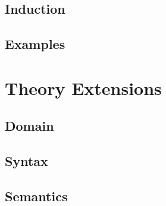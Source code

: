 \documentclass{book}
\begin{document}
\hypertarget{book__pandoc__debug__src__dmt1__lectures__l04_natarithmetic__induction.lean.md}{}
\hypertarget{book__pandoc__debug__src__dmt1__lectures__l04_natarithmetic__induction.lean.md__induction}{%
\section{Induction}\label{book__pandoc__debug__src__dmt1__lectures__l04_natarithmetic__induction.lean.md__induction}}

\hypertarget{book__pandoc__debug__src__dmt1__lectures__l04_natarithmetic__examples.lean.md}{}
\hypertarget{book__pandoc__debug__src__dmt1__lectures__l04_natarithmetic__examples.lean.md__examples}{%
\section{Examples}\label{book__pandoc__debug__src__dmt1__lectures__l04_natarithmetic__examples.lean.md__examples}}

\hypertarget{book__pandoc__debug__src__theoryextensions.md}{}
\hypertarget{book__pandoc__debug__src__theoryextensions.md__theory-extensions}{%
\chapter{Theory Extensions}\label{book__pandoc__debug__src__theoryextensions.md__theory-extensions}}

\hypertarget{book__pandoc__debug__src__dmt1__lectures__l05_theoryextensions__domain.lean.md}{}
\hypertarget{book__pandoc__debug__src__dmt1__lectures__l05_theoryextensions__domain.lean.md__domain}{%
\section{Domain}\label{book__pandoc__debug__src__dmt1__lectures__l05_theoryextensions__domain.lean.md__domain}}

\hypertarget{book__pandoc__debug__src__dmt1__lectures__l05_theoryextensions__syntax.lean.md}{}
\hypertarget{book__pandoc__debug__src__dmt1__lectures__l05_theoryextensions__syntax.lean.md__syntax}{%
\section{Syntax}\label{book__pandoc__debug__src__dmt1__lectures__l05_theoryextensions__syntax.lean.md__syntax}}

\hypertarget{book__pandoc__debug__src__dmt1__lectures__l05_theoryextensions__semantics.lean.md}{}
\hypertarget{book__pandoc__debug__src__dmt1__lectures__l05_theoryextensions__semantics.lean.md__semantics}{%
\section{Semantics}\label{book__pandoc__debug__src__dmt1__lectures__l05_theoryextensions__semantics.lean.md__semantics}}
\end{document}
